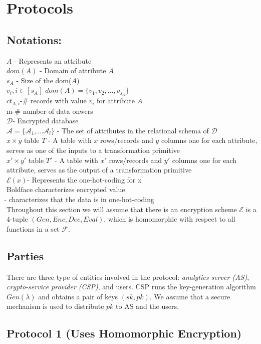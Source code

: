 \section{Protocols}
\subsection{Notations:} $A$ - Represents an attribute\\$dom(A)$ - Domain of attribute  $A$\\$s_A$ - Size of the dom($A$)\\$v_i, i \in [s_A]$-$dom(A)=\{v_1,v_2,\ldots, v_{s_A}\}$\\$ct_{A,i}$-\# records with value $v_i$ for attribute $A$\\m-\# number of data onwers\\$\mathcal{D}$- Encrypted database\\ $\mathcal{A}=\{\mathcal{A}_1,...\mathcal{A}_l\}$ - The set of attributes in the relational schema of $\mathcal{D}$\\
$x \times y$ table $T$ - A table  with $x$ rows/records and $y$ columns one for each  attribute, serves as one of the inputs to a transformation primitive
\\
$x' \times y'$ table $T'$ - A table  with $x'$ rows/records and $y'$ columns one for each  attribute, serves as the output of a transformation primitive\\
$\mathcal{E}(x)$- Represents the one-hot-coding for x\\
Boldface characterizes encrypted value\\
$\tilde{}$ characterizes that the data is in one-hot-coding\\
Throughout this section we will assume that there is an encryption
scheme $\mathcal{E}$ is a $4$-tuple $(Gen,Enc,Dec,Eval)$, which is
homomorphic with respect to all functions in a set $\mathcal{F}$.

\subsection{Parties}

There are three type of entities involved in the protocol: {\it
  analytics server (AS)}, {\it crypto-service provider (CSP)}, and
users. CSP runs the key-generation algorithm $Gen(\lambda)$ and 
obtains a pair of keys $(sk,pk)$. We assume that a secure mechanism 
is used to distribute $pk$ to  AS and the users. 

\subsection{Protocol 1 (Uses Homomorphic Encryption)}

